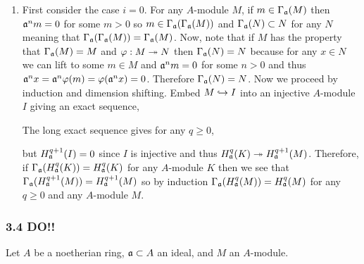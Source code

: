 \documentclass[12pt]{article}
\begin{document}
\begin{enumerate}
\item First consider the case $i = 0$. For any $A$-module $M$, if $m \in \Gamma_{\mathfrak{a}}(M)$ then $\mathfrak{a}^n m = 0$ for some $m > 0$ so $m \in \Gamma_{\mathfrak{a}}(\Gamma_{\mathfrak{a}}(M))$ and $\Gamma_{\mathfrak{a}}(N) \subset N$ for any $N$ meaning that $\Gamma_{\mathfrak{a}}(\Gamma_{\mathfrak{a}}(M)) = \Gamma_{\mathfrak{a}}(M)$. Now, note that if $M$ has the property that $\Gamma_{\mathfrak{a}}(M) = M$ and $\varphi : M \twoheadrightarrow N$ then $\Gamma_{\mathfrak{a}}(N) = N$ because for any $x \in N$ we can lift to some $m \in M$ and $\mathfrak{a}^n m = 0$ for some $n > 0$ and thus $\mathfrak{a}^n x = \mathfrak{a}^n \varphi(m)= \varphi(\mathfrak{a}^n x) = 0$. Therefore $\Gamma_{\mathfrak{a}}(N) = N$. Now we proceed by induction and dimension shifting. Embed $M \hookrightarrow I$ into an injective $A$-module $I$ giving an exact sequence,
\begin{center}
\end{center}
The long exact sequence gives for any $q \ge 0$,
\begin{center}
\end{center}
but $H^{q+1}_{\mathfrak{a}}(I) = 0$ since $I$ is injective and thus $H^q_{\mathfrak{a}}(K) \twoheadrightarrow H^{q+1}_{\mathfrak{a}}(M)$. Therefore, if $\Gamma_{\mathfrak{a}}(H^q_{\mathfrak{a}}(K)) = H^q_{\mathfrak{a}}(K)$ for any $A$-module $K$ then we see that $\Gamma_{\mathfrak{a}}(H^{q+1}_{\mathfrak{a}}(M)) = H^{q+1}_{\mathfrak{a}}(M)$ so by induction $\Gamma_{\mathfrak{a}}(H^{q}_{\mathfrak{a}}(M)) = H^q_{\mathfrak{a}}(M)$ for any $q \ge 0$ and any $A$-module $M$.
\end{enumerate}

\subsubsection{3.4 DO!!}

Let $A$ be a noetherian ring, $\mathfrak{a} \subset A$ an ideal, and $M$ an $A$-module. 
\end{document}
